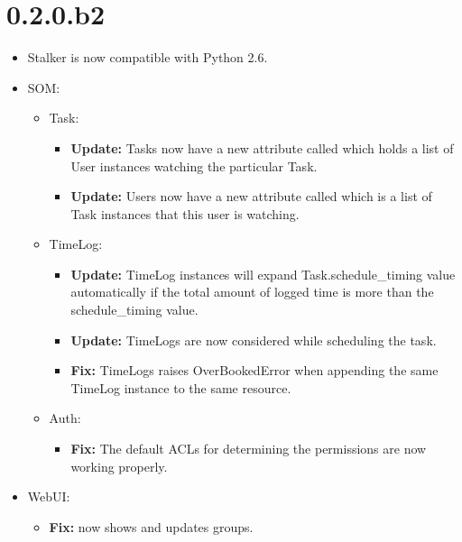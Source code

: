\documentclass[a4paper,10pt,english]{sphinxmanual}
\begin{document}
\section{0.2.0.b2}
\label{changelog:b2}\begin{itemize}
\item {} 
Stalker is now compatible with Python 2.6.

\item {} 
SOM:
\begin{itemize}
\item {} 
Task:
\begin{itemize}
\item {} 
\textbf{Update:} Tasks now have a new attribute called  which holds a
list of User instances watching the particular Task.

\item {} 
\textbf{Update:} Users now have a new attribute called  which is a
list of Task instances that this user is watching.

\end{itemize}

\item {} 
TimeLog:
\begin{itemize}
\item {} 
\textbf{Update:} TimeLog instances will expand Task.schedule\_timing value
automatically if the total amount of logged time is more than the
schedule\_timing value.

\item {} 
\textbf{Update:} TimeLogs are now considered while scheduling the task.

\item {} 
\textbf{Fix:} TimeLogs raises OverBookedError when appending the same TimeLog
instance to the same resource.

\end{itemize}

\item {} 
Auth:
\begin{itemize}
\item {} 
\textbf{Fix:} The default ACLs for determining the permissions are now working
properly.

\end{itemize}

\end{itemize}

\item {} 
WebUI:
\begin{itemize}
\item {} 
\textbf{Fix:}  now shows and updates groups.


\end{itemize}
\end{itemize}
\end{document}
